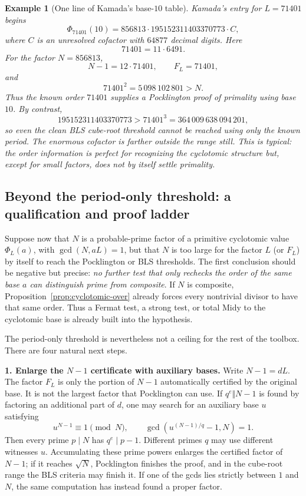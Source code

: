 \documentclass[11pt]{article}
\newtheorem{example}[theorem]{Example}
\begin{document}
\begin{example}[One line of Kamada's base-$10$ table]
Kamada's entry for $L=71401$ begins
\[
\Phi_{71401}(10)
=
856813\cdot195152311403370773\cdot C,
\]
where $C$ is an unresolved cofactor with $64877$ decimal digits.
Here
\[
71401=11\cdot6491.
\]
For the factor $N=856813$,
\[
N-1=12\cdot71401,
\qquad
F_L=71401,
\]
and
\[
71401^2=5\,098\,102\,801>N.
\]
Thus the known order $71401$ supplies a Pocklington proof of primality
using base $10$.  By contrast,
\[
195152311403370773>71401^3
 =364\,009\,638\,094\,201,
\]
so even the clean BLS cube-root threshold cannot be reached using only the
known period.  The enormous cofactor is farther outside the range still.
This is typical: the order information is perfect for recognizing the
cyclotomic structure but, except for small factors, does not by itself settle
primality.
\end{example}

\subsection{Beyond the period-only threshold: a qualification and proof ladder}
\label{subsec:cyclotomic-beyond-threshold}

Suppose now that $N$ is a probable-prime factor of a primitive cyclotomic
value $\Phi_L(a)$, with $\gcd(N,aL)=1$, but that $N$ is too large for the
factor $L$ (or $F_L$) by itself to reach the Pocklington or BLS thresholds.
The first conclusion should be negative but precise: \emph{no further test
that only rechecks the order of the same base $a$ can distinguish prime from
composite}.  If $N$ is composite, Proposition~\ref{prop:cyclotomic-over}
already forces every nontrivial divisor to have that same order.  Thus a
Fermat test, a strong test, or total Midy to the cyclotomic base is already
built into the hypothesis.

The period-only threshold is nevertheless not a ceiling for the rest of the
toolbox.  There are four natural next steps.

\medskip
\noindent\textbf{1. Enlarge the $N-1$ certificate with auxiliary bases.}
Write $N-1=dL$.  The factor $F_L$ is only the portion of $N-1$ automatically
certified by the original base.  It is not the largest factor that
Pocklington can use.  If $q^e\Vert N-1$ is found by factoring an additional
part of $d$, one may search for an auxiliary base $u$ satisfying
\[
u^{N-1}\equiv1\pmod N,
\qquad
\gcd\!\left(u^{(N-1)/q}-1,N\right)=1.
\]
Then every prime $p\mid N$ has $q^e\mid p-1$.  Different primes $q$ may use
different witnesses $u$.  Accumulating these prime powers enlarges the
certified factor of $N-1$; if it reaches $\sqrt N$, Pocklington finishes the
proof, and in the cube-root range the BLS criteria may finish it.  If one of
the gcds lies strictly between $1$ and $N$, the same computation has instead
found a proper factor.
\end{document}
